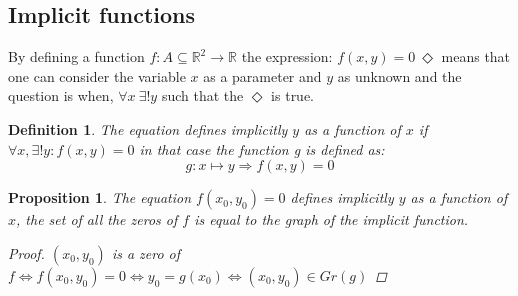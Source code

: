 \documentclass{article}
\newtheorem{definition}{Definition}
\newtheorem{proposition}{Proposition}
\begin{document}
        \subsection*{Implicit functions}
            By defining a function $f:A \subseteq \mathbb{R}^2 \rightarrow \mathbb{R}$ the expression: $f(x,y) = 0 \ \Diamond  $ means that one can consider the variable $x$ as a parameter and $y$ as unknown and the question is when, $\forall x \ \exists! y$ such that the $\Diamond $ is true.  
            \begin{definition}
                The equation defines implicitly $y$ as a function of $x$ if $\forall x, \exists! y: f(x,y) = 0$ in that case the function g is defined as:
                \begin{equation*}
                    g:x \longmapsto y \Rightarrow f(x,y) = 0
                \end{equation*}
            \end{definition}
            \begin{proposition}
                The equation $f(x_0,y_0) = 0$ defines implicitly $y$ as a function of $x$, the set of all the zeros of $f$ is equal to the graph of the implicit function.
                \begin{proof}
                    $(x_0,y_0)$ is a zero of $f \Longleftrightarrow f(x_0,y_0) = 0 \Longleftrightarrow y_0 = g(x_0) \Longleftrightarrow (x_0,y_0) \in Gr(g)$
                \end{proof}
            \end{proposition}
\end{document}
